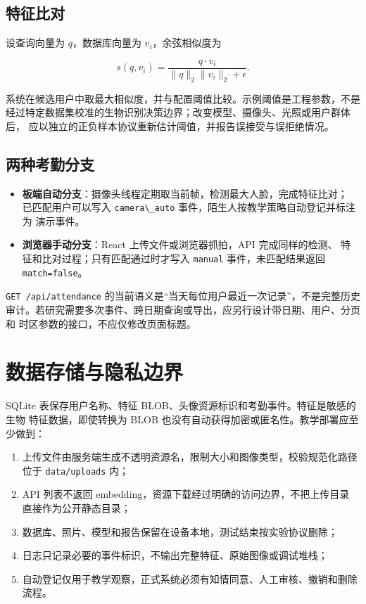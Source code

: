 \subsection{特征比对}\label{ux7279ux5f81ux6bd4ux5bf9}

设查询向量为 \(q\)，数据库向量为 \(v_i\)，余弦相似度为

\[
s(q,v_i)=\frac{q\cdot v_i}{\lVert q\rVert_2\lVert v_i\rVert_2+\epsilon}.
\]

系统在候选用户中取最大相似度，并与配置阈值比较。示例阈值是工程参数，不是
经过特定数据集校准的生物识别决策边界；改变模型、摄像头、光照或用户群体后，
应以独立的正负样本协议重新估计阈值，并报告误接受与误拒绝情况。

\subsection{两种考勤分支}\label{ux4e24ux79cdux8003ux52e4ux5206ux652f}

\begin{itemize}
\tightlist
\item
  \textbf{板端自动分支}：摄像头线程定期取当前帧，检测最大人脸，完成特征比对；
  已匹配用户可以写入 \passthrough{\lstinline!camera\_auto!}
  事件，陌生人按教学策略自动登记并标注为 演示事件。
\item
  \textbf{浏览器手动分支}：React 上传文件或浏览器抓拍，API
  完成同样的检测、 特征和比对过程；只有匹配通过时才写入
  \passthrough{\lstinline!manual!} 事件，未匹配结果返回
  \passthrough{\lstinline!match=false!}。
\end{itemize}

\passthrough{\lstinline!GET /api/attendance!}
的当前语义是``当天每位用户最近一次记录''，不是完整历史
审计。若研究需要多次事件、跨日期查询或导出，应另行设计带日期、用户、分页和
时区参数的接口，不应仅修改页面标题。

\section{数据存储与隐私边界}\label{ux6570ux636eux5b58ux50a8ux4e0eux9690ux79c1ux8fb9ux754c}

SQLite 表保存用户名称、特征
BLOB、头像资源标识和考勤事件。特征是敏感的生物 特征数据，即使转换为 BLOB
也没有自动获得加密或匿名性。教学部署应至少做到：

\begin{enumerate}
\def\labelenumi{\arabic{enumi}.}
\tightlist
\item
  上传文件由服务端生成不透明资源名，限制大小和图像类型，校验规范化路径
  位于 \passthrough{\lstinline!data/uploads!} 内；
\item
  API 列表不返回 embedding，资源下载经过明确的访问边界，不把上传目录
  直接作为公开静态目录；
\item
  数据库、照片、模型和报告保留在设备本地，测试结束按实验协议删除；
\item
  日志只记录必要的事件标识，不输出完整特征、原始图像或调试堆栈；
\item
  自动登记仅用于教学观察，正式系统必须有知情同意、人工审核、撤销和删除
  流程。
\end{enumerate}

